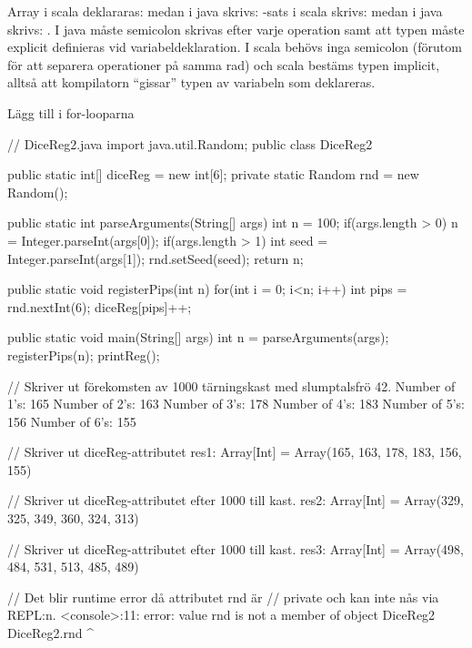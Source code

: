 {\SubtaskSolved  Array i scala deklararas:  medan i java skrivs: 
-sats i scala skrivs:  medan i java skrivs: .
I java måste semicolon skrivas efter varje operation samt att typen måste explicit definieras vid variabeldeklaration.
I scala behövs inga semicolon (förutom för att separera operationer på samma rad) och scala bestäms typen implicit, alltså att kompilatorn “gissar” typen av variabeln som deklareras.

\SubtaskSolved  Lägg till  i for-looparna

\SubtaskSolved  \begin{Code}[language=Java]
// DiceReg2.java
import java.util.Random;
public class DiceReg2{
	public static int[] diceReg = new int[6];
	private static Random rnd = new Random();

	public static int parseArguments(String[] args){
		int n = 100;
		if(args.length > 0) {
			n = Integer.parseInt(args[0]);
		}
		if(args.length > 1) {
			int seed = Integer.parseInt(args[1]);
			rnd.setSeed(seed);
		}
		return n;
	}

	public static void registerPips(int n) {
		for(int i = 0; i<n; i++) {
			int pips = rnd.nextInt(6);
			diceReg[pips]++;
		}
	}

	public static void main(String[] args) {
		int n = parseArguments(args);
		registerPips(n);
		printReg();
	}
}
\end{Code}

\SubtaskSolved  \begin{REPL}
  // Skriver ut förekomsten av 1000 tärningskast med slumptalsfrö 42.
Number of 1's: 165
Number of 2's: 163
Number of 3's: 178
Number of 4's: 183
Number of 5's: 156
Number of 6's: 155

  // Skriver ut diceReg-attributet
res1: Array[Int] = Array(165, 163, 178, 183, 156, 155)

  // Skriver ut diceReg-attributet efter 1000 till kast.
res2: Array[Int] = Array(329, 325, 349, 360, 324, 313)

  // Skriver ut diceReg-attributet efter 1000 till kast.
res3: Array[Int] = Array(498, 484, 531, 513, 485, 489)

  // Det blir runtime error då attributet rnd är
  // private och kan inte nås via REPL:n.
<console>:11: error: value rnd is not a member of object DiceReg2
	DiceReg2.rnd
				    ^
\end{REPL}

}
